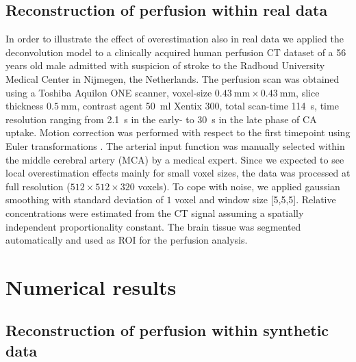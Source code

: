 \documentclass[final,5p,times,twocolumn]{elsarticle}
\begin{document}
	\subsection{Reconstruction of perfusion within real data}\label{sec:RealData}
	In order to illustrate the effect of overestimation also in real data we applied the deconvolution model to a clinically acquired human perfusion CT dataset of a 56 years old male admitted with suspicion of stroke to the Radboud University Medical Center in Nijmegen, the Netherlands.
	The perfusion scan was obtained using a Toshiba Aquilon ONE scanner, voxel-size $\SI{0.43}{\milli\meter}\times\SI{0.43}{\milli\meter}$, slice thickness $\SI{0.5}{\milli\meter}$, contrast agent \SI{50}{\milli\litre} Xentix 300, total scan-time \SI{114}{\second}, time resolution ranging from \SI{2.1}{\second} in the early- to \SI{30}{\second} in the late phase of CA uptake.
	Motion correction was performed with respect to the first timepoint using Euler transformations \cite{Mendrik11}.
	The arterial input function was manually selected within the middle cerebral artery (MCA) by a medical expert.
	Since we expected to see local overestimation effects mainly for small voxel sizes, the data was processed at full resolution ($512\times512\times320$ voxels). 
	To cope with noise, we applied gaussian smoothing with standard deviation of $1$ voxel and window size [5,5,5].
	Relative concentrations were estimated from the CT signal assuming a spatially independent proportionality constant. 
	The brain tissue was segmented automatically and used as ROI for the perfusion analysis.


	\section{Numerical results}	
	\subsection{Reconstruction of perfusion within synthetic data}\label{sec:RecPhantom}
\end{document}
